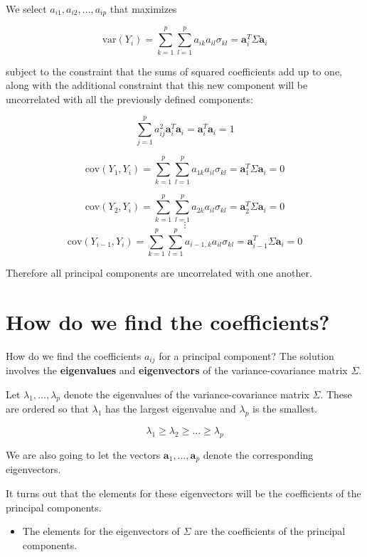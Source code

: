 \documentclass[]{book}
\newenvironment{rmdblock}[1]
  {\begin{shaded*}
  \begin{itemize}
  \renewcommand{\labelitemi}{
    \raisebox{-.7\height}[0pt][0pt]{
      {\setkeys{Gin}{width=2em,keepaspectratio}\texttt{[image: img/icons/\#1]}}
    }
  }
  \item
  }
  {
  \end{itemize}
  \end{shaded*}
  }
\newenvironment{rmdinsight}
  {\begin{rmdblock}{insight}}
  {\end{rmdblock}}
\begin{document}
We select \(a_{i1},a_{i2},\ldots,a_{ip}\) that maximizes

\[ \text{var}(Y_i) = \sum_{k=1}^{p}\sum_{l=1}^{p}a_{ik}a_{il}\sigma_{kl} = \mathbf{a}^T_i\Sigma\mathbf{a}_i \]

subject to the constraint that the sums of squared coefficients add up
to one, along with the additional constraint that this new component
will be uncorrelated with all the previously defined components:

\[ \sum_{j=1}^{p}a^2_{ij} \mathbf{a}^T_i\mathbf{a}_i = \mathbf{a}^T_i\mathbf{a}_i = 1\]

\[ \text{cov}(Y_1, Y_i) = \sum_{k=1}^{p}\sum_{l=1}^{p}a_{1k}a_{il}\sigma_{kl} = \mathbf{a}^T_1\Sigma\mathbf{a}_i = 0 \]

\[\text{cov}(Y_2, Y_i) = \sum_{k=1}^{p}\sum_{l=1}^{p}a_{2k}a_{il}\sigma_{kl} = \mathbf{a}^T_2\Sigma\mathbf{a}_i = 0\]
\[\vdots\]
\[\text{cov}(Y_{i-1}, Y_i) = \sum_{k=1}^{p}\sum_{l=1}^{p}a_{i-1,k}a_{il}\sigma_{kl} = \mathbf{a}^T_{i-1}\Sigma\mathbf{a}_i = 0\]

Therefore all principal components are uncorrelated with one another.

\section{How do we find the
coefficients?}\label{how-do-we-find-the-coefficients}

How do we find the coefficients \(a_{ij}\) for a principal component?
The solution involves the \textbf{eigenvalues} and \textbf{eigenvectors}
of the variance-covariance matrix \(\Sigma\).

Let \(\lambda_1,\ldots,\lambda_p\) denote the eigenvalues of the
variance-covariance matrix \(\Sigma\). These are ordered so that
\(\lambda_1\) has the largest eigenvalue and \(\lambda_p\) is the
smallest.

\[ \lambda_1 \ge \lambda_2 \ge \dots \ge \lambda_p \]

We are also going to let the vectors
\(\mathbf{a}_1, \ldots,\mathbf{a}_p\) denote the corresponding
eigenvectors.

It turns out that the elements for these eigenvectors will be the
coefficients of the principal components.

\begin{rmdinsight}
The elements for the eigenvectors of \(\Sigma\) are the coefficients of
the principal components.
\end{rmdinsight}
\end{document}
